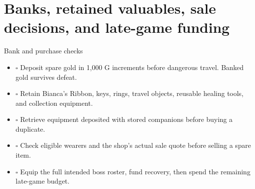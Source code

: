 \section{Banks, retained valuables, sale decisions, and late-game funding}

\begin{routecheck}[breakable=false]{Bank and purchase checks}
\begin{itemize}
\item \(\square\) Deposit spare gold in 1,000 G increments before dangerous travel. Banked gold survives defeat.
\item \(\square\) Retain Bianca's Ribbon, keys, rings, travel objects, reusable healing tools, and collection equipment.
\item \(\square\) Retrieve equipment deposited with stored companions before buying a duplicate.
\item \(\square\) Check eligible wearers and the shop's actual sale quote before selling a spare item.
\item \(\square\) Equip the full intended boss roster, fund recovery, then spend the remaining late-game budget.
\end{itemize}
\end{routecheck}

